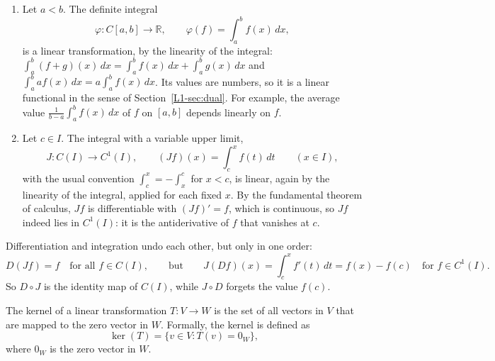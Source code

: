 \begin{example}[Integration]\label{L1-ex:integration}
    \begin{enumerate}
        \item Let $a < b$. The definite integral
        \[\varphi: C[a, b] \to \mathbb{R}, \qquad \varphi(f) = \int_a^b f(x)\, dx,\]
        is a linear transformation, by the linearity of the integral: $\int_a^b (f + g)(x)\, dx = \int_a^b f(x)\, dx + \int_a^b g(x)\, dx$ and $\int_a^b af(x)\, dx = a\int_a^b f(x)\, dx$. Its values are numbers, so it is a linear functional in the sense of Section~\ref{L1-sec:dual}. For example, the average value $\frac{1}{b - a}\int_a^b f(x)\, dx$ of $f$ on $[a, b]$ depends linearly on $f$.
        \item Let $c \in I$. The integral with a variable upper limit,
        \[J: C(I) \to C^1(I), \qquad (Jf)(x) = \int_c^x f(t)\, dt \qquad (x \in I),\]
        with the usual convention $\int_c^x = -\int_x^c$ for $x < c$, is linear, again by the linearity of the integral, applied for each fixed $x$. By the fundamental theorem of calculus, $Jf$ is differentiable with $(Jf)' = f$, which is continuous, so $Jf$ indeed lies in $C^1(I)$: it is the antiderivative of $f$ that vanishes at $c$.
    \end{enumerate}
\end{example}

Differentiation and integration undo each other, but only in one order:
\[D(Jf) = f \quad \text{for all } f \in C(I), \qquad \text{but} \qquad J(Df)(x) = \int_c^x f'(t)\, dt = f(x) - f(c) \quad \text{for } f \in C^1(I).\]
So $D \circ J$ is the identity map of $C(I)$, while $J \circ D$ forgets the value $f(c)$.

\begin{definition}[Kernel]
    The kernel of a linear transformation $T: V \to W$ is the set of all vectors in $V$ that are mapped to the zero vector in $W$. Formally, the kernel is defined as
    \[\ker(T) = \{v \in V : T(v) = 0_W\},\]
    where $0_W$ is the zero vector in $W$.
\end{definition}

